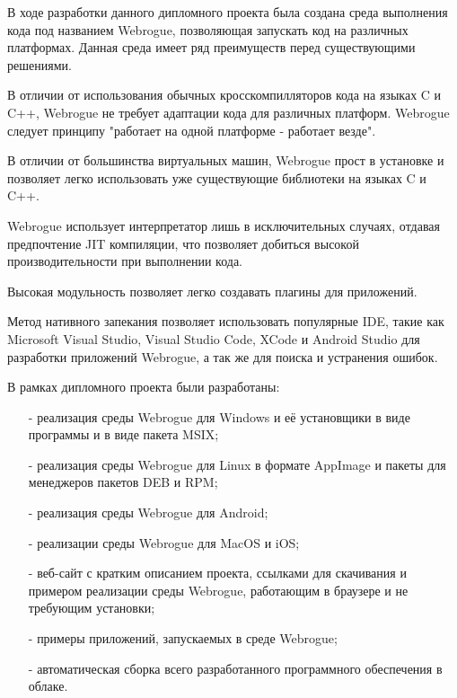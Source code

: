 В ходе разработки данного дипломного проекта была создана среда выполнения кода под названием Webrogue, позволяющая запускать код на различных платформах.
Данная среда имеет ряд преимуществ перед существующими решениями.

В отличии от использования обычных кросскомпилляторов кода на языках C и C++, Webrogue не требует адаптации кода для различных платформ. 
Webrogue следует принципу "работает на одной платформе - работает везде".

В отличии от большинства виртуальных машин, Webrogue прост в установке и позволяет легко использовать уже существующие библиотеки на языках C и C++.

Webrogue использует интерпретатор лишь в исключительных случаях, отдавая предпочтение JIT компиляции, что позволяет добиться высокой производительности при выполнении кода.

Высокая модульность позволяет легко создавать плагины для приложений.

Метод нативного запекания позволяет использовать популярные IDE, такие как Microsoft Visual Studio, Visual Studio Code, XCode и Android Studio для разработки приложений Webrogue, а так же для поиска и устранения ошибок.

В рамках дипломного проекта были разработаны:
\begin{itemize}
    \item[-] реализация среды Webrogue для Windows и её установщики в виде программы и в виде пакета MSIX;
    \item[-] реализация среды Webrogue для Linux в формате AppImage и пакеты для менеджеров пакетов DEB и RPM;
    \item[-] реализация среды Webrogue для Android;
    \item[-] реализации среды Webrogue для MacOS и iOS;
    \item[-] веб-сайт с кратким описанием проекта, ссылками для скачивания и примером реализации среды Webrogue, работающим в браузере и не требующим установки;
    \item[-] примеры приложений, запускаемых в среде Webrogue;
    \item[-] автоматическая сборка всего разработанного программного обеспечения в облаке.
\end{itemize}

